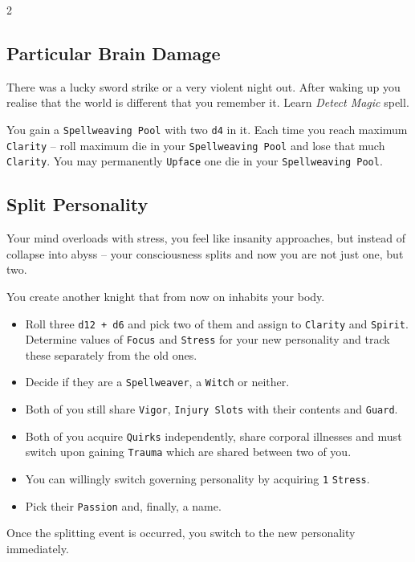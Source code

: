 \documentclass{osr-template/zine}
\begin{document}
\begin{multicols*}{2}
    \subsection*{Particular Brain Damage}

    There was a lucky sword strike or a very violent night out. After waking up you realise that the world is different that you remember it. 
    Learn \textit{Detect Magic} spell.

    You gain a \texttt{Spellweaving Pool} with two \texttt{d4} in it. 
    Each time you reach maximum \texttt{Clarity} -- roll maximum die in your \texttt{Spellweaving Pool} and lose that much \texttt{Clarity}. 
    You may permanently \texttt{Upface} one die in your \texttt{Spellweaving Pool}. 

    \subsection*{Split Personality}

    Your mind overloads with stress, you feel like insanity approaches, but instead of collapse into abyss -- your consciousness splits and now you are not just one, but two.

    You create another knight that from now on inhabits your body. 

    \begin{itemize}[nosep]
        \item Roll three \texttt{d12 + d6} and pick two of them and assign to \texttt{Clarity} and \texttt{Spirit}. Determine values of \texttt{Focus} and \texttt{Stress} for your new personality and track these separately from the old ones.
        \item Decide if they are a \texttt{Spellweaver}, a \texttt{Witch} or neither.
        \item Both of you still share \texttt{Vigor}, \texttt{Injury Slots} with their contents and \texttt{Guard}.
        \item Both of you acquire \texttt{Quirks} independently, share corporal illnesses and must switch upon gaining \texttt{Trauma} which are shared between two of you.
        \item You can willingly switch governing personality by acquiring \texttt{1} \texttt{Stress}.
        \item Pick their \texttt{Passion} and, finally, a name. 
    \end{itemize}
Once the splitting event is occurred, you switch to the new personality immediately. 
    
    

\end{multicols*}
\end{document}
